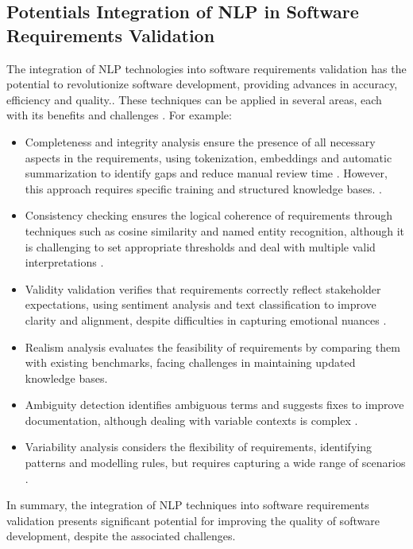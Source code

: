 \subsection{Potentials Integration of NLP in Software Requirements Validation}
The integration of NLP technologies into software requirements validation has the potential to revolutionize software development, providing advances in accuracy, efficiency and quality.\cite{Alamelu2021}. These techniques can be applied in several areas, each with its benefits and challenges \cite{Wiegers2013}. For example:
\begin{itemize}
 \item Completeness and integrity analysis ensure the presence of all necessary aspects in the requirements, using tokenization, embeddings and automatic summarization to identify gaps and reduce manual review time \cite{Acheampong2021}. However, this approach requires specific training and structured knowledge bases. \cite{polignano2019alberto}.
 \item Consistency checking ensures the logical coherence of requirements through techniques such as cosine similarity and named entity recognition, although it is challenging to set appropriate thresholds and deal with multiple valid interpretations \cite{Kamalrudin2015, Belzner2023}.
 \item Validity validation verifies that requirements correctly reflect stakeholder expectations, using sentiment analysis and text classification to improve clarity and alignment, despite difficulties in capturing emotional nuances \cite{lewis2020,sonbol2022,polignano2019alberto}.
 \item Realism analysis evaluates the feasibility of requirements by comparing them with existing benchmarks, facing challenges in maintaining updated knowledge bases\cite{Devlin2018}.
 \item Ambiguity detection identifies ambiguous terms and suggests fixes to improve documentation, although dealing with variable contexts is complex \cite{Devlin2018}.
 \item Variability analysis considers the flexibility of requirements, identifying patterns and modelling rules, but requires capturing a wide range of scenarios \cite{Devlin2018}.
\end{itemize}
In summary, the integration of NLP techniques into software requirements validation presents significant potential for improving the quality of software development, despite the associated challenges.\newline
